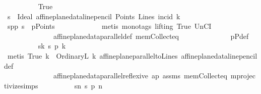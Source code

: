 \begin{isabellebody}
\ \ \ \ \ \ \ \ \isamarkupfalse%
\ True\isanewline
\ \ \ \ \ \ \ \ \isamarkupfalse%
\ {\isacharquery}{\kern0pt}s\ {\isacharequal}{\kern0pt}\ {\isachardoublequoteopen}Ideal\ {\isacharparenleft}{\kern0pt}affine{\isacharunderscore}{\kern0pt}plane{\isacharunderscore}{\kern0pt}data{\isachardot}{\kern0pt}line{\isacharunderscore}{\kern0pt}pencil\ Points\ Lines\ incid\ k{}{\isacharparenright}{\kern0pt}{\isachardoublequoteclose}\isanewline
\ \ \ \ \ \ \ \ \isamarkupfalse%
\ spp{\isacharcolon}{\kern0pt}\ {\isachardoublequoteopen}{\isacharquery}{\kern0pt}s\ {\isasymin}\ pPoints{\isachardoublequoteclose}\ \isanewline
\ \ \ \ \ \ \ \ \ \ \isamarkupfalse%
\ {\isacharparenleft}{\kern0pt}metis\ {\isacharparenleft}{\kern0pt}mono{\isacharunderscore}{\kern0pt}tags{\isacharcomma}{\kern0pt}\ lifting{\isacharparenright}{\kern0pt}\ True\ UnCI\isanewline
\ \ \ \ \ \ \ \ \ \ \ \ \ \ affine{\isacharunderscore}{\kern0pt}plane{\isacharunderscore}{\kern0pt}data{\isachardot}{\kern0pt}parallel{\isacharunderscore}{\kern0pt}def\ mem{\isacharunderscore}{\kern0pt}Collect{\isacharunderscore}{\kern0pt}eq\isanewline
\ \ \ \ \ \ \ \ \ \ \ \ \ \ pPdef{\isacharparenright}{\kern0pt}\isanewline
\ \ \ \ \ \ \ \ \isamarkupfalse%
\ sk{\isacharcolon}{\kern0pt}\ {\isachardoublequoteopen}{\isacharquery}{\kern0pt}s\ p{\isasymlhd}\ k{\isachardoublequoteclose}\isanewline
\ \ \ \ \ \ \ \ \ \ \isamarkupfalse%
\ {\isacharparenleft}{\kern0pt}metis\ True\ {\isacartoucheopen}k\ {\isacharequal}{\kern0pt}\ OrdinaryL\ k{}{\isacartoucheclose}\ affine{\isacharunderscore}{\kern0pt}plane{\isachardot}{\kern0pt}parallel{\isacharunderscore}{\kern0pt}to{\isacharunderscore}{\kern0pt}Lines{\isacharparenleft}{\kern0pt}{}{\isacharparenright}{\kern0pt}\ affine{\isacharunderscore}{\kern0pt}plane{\isacharunderscore}{\kern0pt}data{\isachardot}{\kern0pt}line{\isacharunderscore}{\kern0pt}pencil{\isacharunderscore}{\kern0pt}def\isanewline
\ \ \ \ \ \ \ \ \ \ \ \ \ \ affine{\isacharunderscore}{\kern0pt}plane{\isacharunderscore}{\kern0pt}data{\isachardot}{\kern0pt}parallel{\isacharunderscore}{\kern0pt}reflexive\ ap\ assms{\isacharparenleft}{\kern0pt}{}{\isacharparenright}{\kern0pt}\ mem{\isacharunderscore}{\kern0pt}Collect{\isacharunderscore}{\kern0pt}eq\ mprojectivize{\isachardot}{\kern0pt}simps{\isacharparenleft}{\kern0pt}{}{\isacharparenright}{\kern0pt}{\isacharparenright}{\kern0pt}\isanewline
\ \ \ \ \ \ \ \ \isamarkupfalse%
\ sn{\isacharcolon}{\kern0pt}\ {\isachardoublequoteopen}{\isacharquery}{\kern0pt}s\ p{\isasymlhd}\ n{\isachardoublequoteclose}\isanewline

\end{isabellebody}
